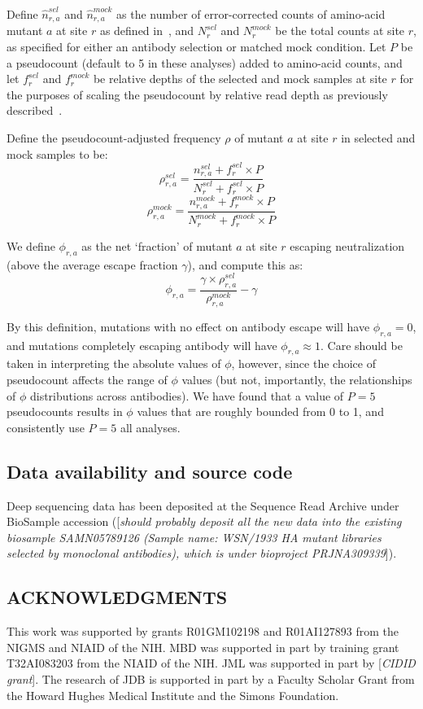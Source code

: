 \documentclass[11pt]{article}
\newcommand{\comment}[1]{{\color{red}[\textsl{#1}]}}
\begin{document}
Define $\hat{n}_{r,a}^{sel}$ and $\hat{n}_{r,a}^{mock}$ as the number of error-corrected counts of amino-acid mutant $a$ at site $r$ as defined in~\cite{doud2017complete}, and $N_r^{sel}$ and $N_r^{mock}$ be the total counts at site $r$, as specified for either an antibody selection or matched mock condition.
Let $P$ be a pseudocount (default to 5 in these analyses) added to amino-acid counts, and let $f_{r}^{sel}$ and $f_{r}^{mock}$ be relative depths of the selected and mock samples at site $r$ for the purposes of scaling the pseudocount by relative read depth as previously described~\cite{doud2017complete}.

Define the pseudocount-adjusted frequency $\rho$ of mutant $a$ at site $r$ in selected and mock samples to be:
$$\rho_{r,a}^{sel} = \frac{n_{r,a}^{sel}+f_r^{sel}\times P}{N_r^{sel}+f_r^{sel}\times  P}$$
$$\rho_{r,a}^{mock} = \frac{n_{r,a}^{mock}+f_r^{mock}\times P}{N_r^{mock}+f_r^{mock}\times  P}$$

We define $\phi_{r,a}$ as the net `fraction' of mutant $a$ at site $r$ escaping neutralization (above the average escape fraction $\gamma$), and compute this as:
$$\phi_{r,a} = \frac{\gamma \times \rho_{r,a}^{sel}}{\rho_{r,a}^{mock}} - \gamma$$

By this definition, mutations with no effect on antibody escape will have $\phi_{r,a} =0$, and mutations completely escaping antibody will have $\phi_{r,a} \approx 1$.
Care should be taken in interpreting the absolute values of $\phi$, however, since the choice of pseudocount affects the range of $\phi$ values (but not, importantly, the relationships of $\phi$ distributions across antibodies).
We have found that a value of $P=5$ pseudocounts results in $\phi$ values that are roughly bounded from 0 to 1, and consistently use $P=5$ all analyses.

\subsection*{Data availability and source code}
Deep sequencing data has been deposited at the Sequence Read Archive under BioSample accession (\comment{should probably deposit all the new data into the existing biosample SAMN05789126 (Sample name: WSN/1933 HA mutant libraries selected by monoclonal antibodies), which is under bioproject PRJNA309339}).




\clearpage

\small
\subsection*{ACKNOWLEDGMENTS}
This work was supported by grants R01GM102198 and R01AI127893 from the NIGMS and NIAID of the NIH.
MBD was supported in part by training grant T32AI083203 from the NIAID of the NIH.
JML was supported in part by \comment{CIDID grant}.
The research of JDB is supported in part by a Faculty Scholar Grant from the Howard Hughes Medical Institute and the Simons Foundation.
\end{document}
